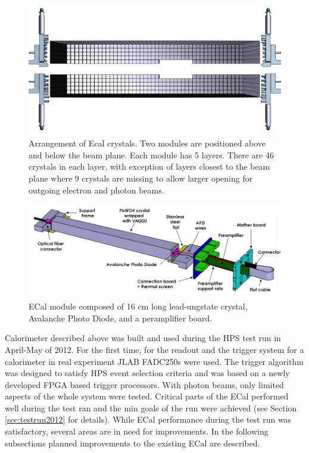 \begin{figure}[t]
\includegraphics[width=\textwidth]{ecal/ECal.png}
\caption{\small{Arrangement of Ecal crystals. Two modules are positioned above and below the beam plane. Each module has 5 layers. There are 46 crystals in each layer, with exception of layers closest to the beam plane where 9 crystals are missing to allow larger opening for outgoing electron and photon beams.}}\label{fig:ecal}
\end{figure}

\begin{figure}[t]
\includegraphics[width=\textwidth]{ecal/ecal_module.png}
\caption{\small{ECal module composed of 16 cm long lead-ungstate crystal, Avalanche Photo Diode, and a peramplifier board.}}\label{fig:module}
\end{figure}

Calorimeter described above was built and used during the HPS test run in April-May of 2012. For the first time, for the readout and the trigger system for a calorimeter in real experiment JLAB FADC250s were used. The trigger algorithm was designed to satisfy HPS event selection criteria and was based on a newly developed FPGA based trigger processors. With photon beams, only limited aspects of the whole system were tested. Critical parts of the ECal performed well during the test ran and the min goals of the run were achieved (see Section \ref{sec:testrun2012} for details). While ECal performance during the test run was satisfactory, several areas are in need for improvements. In the following subsections planned improvements to the existing ECal are described.   


